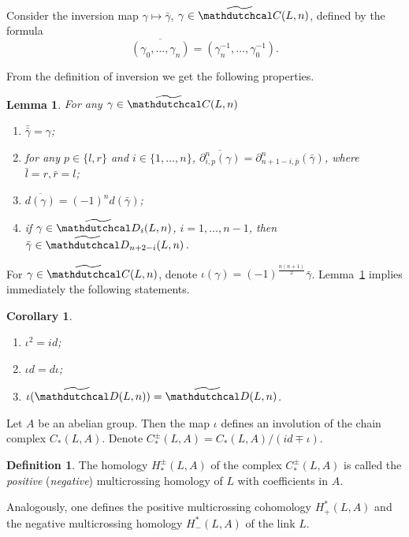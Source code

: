 \documentclass{article}
\newtheorem{lemma}{Lemma}
\newtheorem{corollary}{Corollary}
\theoremstyle{definition}
\newtheorem{definition}{Definition}
\theoremstyle{remark}
\begin{document}
Consider the inversion map $\gamma\mapsto \bar\gamma$, $\gamma\in \widetilde{\mathdutchcal C}(L,n)$, defined by the formula
\[
\overline{(\gamma_0,\dots,\gamma_n)}=(\gamma_n^{-1},\dots,\gamma^{-1}_0).
\]

From the definition of inversion we get the following properties.
\begin{lemma}\label{lem:multicrossing_inversion}
For any $\gamma\in \widetilde{\mathdutchcal C}(L,n)$
\begin{enumerate}
    \item $\bar{\bar\gamma}=\gamma$;
    \item for any $p\in\{l,r\}$ and $i\in\{1,\dots,n\}$,
$
\overline{\partial^n_{i,p}(\gamma)}=\partial^n_{n+1-i,\bar p}(\bar\gamma)
$,
where $\bar l=r, \bar r=l$;

    \item  $\overline{d(\gamma)}=(-1)^n d(\bar\gamma)$;

    \item if $\gamma\in \widetilde{\mathdutchcal D}_i(L,n)$, $i=1,\dots,n-1$, then $\bar\gamma\in\widetilde{\mathdutchcal D}_{n+2-i}(L,n)$.
\end{enumerate}
\end{lemma}

For $\gamma\in \widetilde{\mathdutchcal C}(L,n)$, denote $\iota(\gamma)=(-1)^{\frac{n(n+1)}2}\bar\gamma$. Lemma~\ref{lem:multicrossing_inversion} implies immediately the following statements.

\begin{corollary}\label{cor:multicrossing_inversion}
\begin{enumerate}
    \item $\iota^2=id$;
    \item $\iota d=d\iota$;
    \item $\iota(\widetilde{\mathdutchcal D}(L,n))=\widetilde{\mathdutchcal D}(L,n)$.
\end{enumerate}
\end{corollary}

Let $A$ be an abelian group. Then the map $\iota$ defines an involution of the chain complex $C_*(L,A)$. Denote $C^\pm_*(L,A)=C_*(L,A)/(id\mp\iota)$.

\begin{definition}\label{def:positive_multicrossing_homology}
    The homology $H^\pm_*(L,A)$ of the complex $C^\pm_*(L,A)$ is called the \emph{positive} (\emph{negative}) multicrossing homology of $L$ with coefficients in $A$.

    Analogously, one defines the positive multicrossing cohomology $H_+^*(L,A)$ and the negative multicrossing homology $H_-^*(L,A)$ of the link $L$.
\end{definition}
\end{document}
